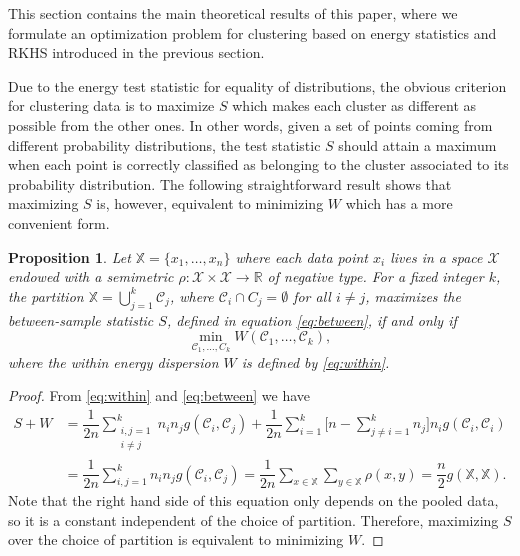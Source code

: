 \documentclass[aps,preprint,nofootinbib,floatfix]{revtex4-1}
\newtheorem{proposition}[theorem]{Proposition}
\newcommand\C{{\mathcal{C}}}
\begin{document}
This section contains the main theoretical results of this paper, where 
we formulate an optimization problem for clustering 
based on energy statistics and RKHS introduced in the previous section.

Due to the energy test statistic for equality of distributions,
the obvious
criterion for clustering data is to 
maximize $S$ which makes 
each cluster as different
as possible from the other ones.
In other words, given a set of points coming from different probability
distributions, the test statistic $S$ should attain a maximum when 
each point is correctly
classified as belonging to the cluster associated to its probability
distribution.
The following 
straightforward result
shows that maximizing $S$ is, however, equivalent to minimizing
$W$ which has a more convenient form.

\begin{proposition}
\label{th:minimize}
Let $\mathbb{X} = \{x_1,\dotsc,x_n\}$ where each data point
$x_i$ lives in a space $\mathcal{X}$ endowed with a semimetric $\rho:
\mathcal{X}\times\mathcal{X} \to \mathbb{R}$ of
negative type. For a fixed integer $k$,
the partition
$\mathbb{X} = \bigcup_{j=1}^k \C_j$, where $\C_i \cap C_j = \emptyset$ for
all $i\ne j$, maximizes the between-sample statistic $S$, defined
in equation \eqref{eq:between}, if and only if
\begin{equation}
\label{eq:minimize}
\min_{\C_1,\dotsc,C_k  } W(
\C_1, \dotsc, \C_k),
\end{equation}
where the within energy dispersion $W$ is defined by \eqref{eq:within}.
\end{proposition}
\begin{proof}
From \eqref{eq:within} and \eqref{eq:between}
we have
\begin{equation}
\begin{split}
S + W &= 
\dfrac{1}{2n} \sum_{\substack{i,j=1 \\ i\ne j}}^k n_i n_j g(\C_i, \C_j)
+ \dfrac{1}{2n} \sum_{i=1}^{k} 
\bigg[ n - 
\sum_{j\ne i = 1}^k n_j \bigg] 
n_i g(\C_i, \C_i) \\
& = \dfrac{1}{2n} \sum_{i,j=1}^k n_i n_j g(\C_i, \C_j)
= \dfrac{1}{2n} \sum_{x \in \mathbb{X}} \sum_{y \in \mathbb{X}} \rho(x,y)
= \dfrac{n}{2} g(\mathbb{X}, \mathbb{X}).
\end{split}
\end{equation}
Note that the right hand side of this equation 
only depends on the pooled data, so it is a constant
independent of the choice of partition. Therefore, maximizing
$S$ over the choice of partition is equivalent to minimizing $W$.
\end{proof}
\end{document}
